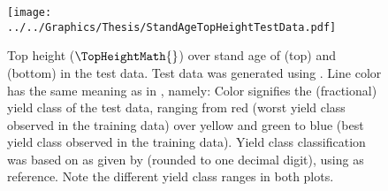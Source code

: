 \begin{figure}[h]
  \centering
  \texttt{[image: ../../Graphics/Thesis/StandAgeTopHeightTestData.pdf]}
  \caption{Top height (\(\TopHeightMath{}\)) over stand age of \Beech{} (top) and \Spruce{} (bottom) in the test data.  Test data was generated using .  Line color has the same meaning as in , namely:  Color signifies the (fractional) yield class of the test data, ranging from red (worst yield class observed in the training data) over yellow and green to blue (best yield class observed in the training data).  Yield class classification was based on \ProductivityIndexText{} as given by  (rounded to one decimal digit), using  as reference.  Note the different yield class ranges in both plots.}
  \label{fig:StandAgeTopHeightTestData}
\end{figure}

\clearpage{}

